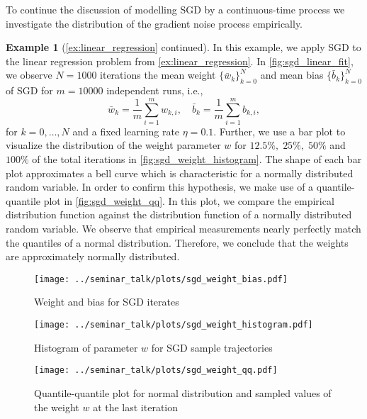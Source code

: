 \documentclass[12pt]{article}
\theoremstyle{definition}
\newtheorem{example}[example]{Example}
\numberwithin{equation}{section}
\begin{document}
To continue the discussion of modelling SGD by a continuous-time process we investigate the distribution of the gradient noise process empirically.
\begin{example}[\autoref{ex:linear_regression} continued]
  \label{ex:sgd}
  In this example, we apply SGD to the linear regression problem from \autoref{ex:linear_regression}. In \autoref{fig:sgd_linear_fit}, we observe $N = 1000$ iterations the mean weight $\{\bar{w}_k\}_{k=0}^{N}$ and mean bias $\{\bar{b}_k\}_{k=0}^{N}$ of SGD for $m=10000$ independent runs, i.e.,
  \begin{equation*}
    \bar{w}_k = \frac{1}{m}\sum_{i=1}^m w_{k,i}, \quad \bar{b}_k = \frac{1}{m}\sum_{i=1}^mb_{k,i},
  \end{equation*}
  for $k = 0, \dots, N$ and a fixed  learning rate $\eta = 0.1$.
  Further, we use a bar plot to visualize the distribution of the weight parameter $w$ for $12.5\%,\; 25\%,\; 50\%$ and $100\%$ of the total iterations in \autoref{fig:sgd_weight_histogram}. The shape of each bar plot approximates a bell curve which is characteristic for a normally distributed random variable. In order to confirm this hypothesis, we make use of a quantile-quantile plot in \autoref{fig:sgd_weight_qq}.
  In this plot, we compare the empirical distribution function against the distribution function of a normally distributed random variable. We observe that empirical measurements nearly perfectly match the quantiles of a normal distribution. Therefore, we conclude that the weights are approximately normally distributed.
  \begin{figure}[htb]
    \centering
    \texttt{[image: ../seminar\_talk/plots/sgd\_weight\_bias.pdf]}
    \caption{Weight and bias for SGD iterates}
    \label{fig:sgd_linear_fit}
  \end{figure}
  \begin{figure}[htb]
    \centering
    \texttt{[image: ../seminar\_talk/plots/sgd\_weight\_histogram.pdf]}
    \caption{Histogram of parameter $w$ for SGD sample trajectories}
    \label{fig:sgd_weight_histogram}
  \end{figure}
  \begin{figure}[htb]
    \centering
    \texttt{[image: ../seminar\_talk/plots/sgd\_weight\_qq.pdf]}
    \caption{Quantile-quantile plot for normal distribution and sampled values of the weight $w$ at the last iteration}
    \label{fig:sgd_weight_qq}
  \end{figure}
\end{example}
\end{document}
